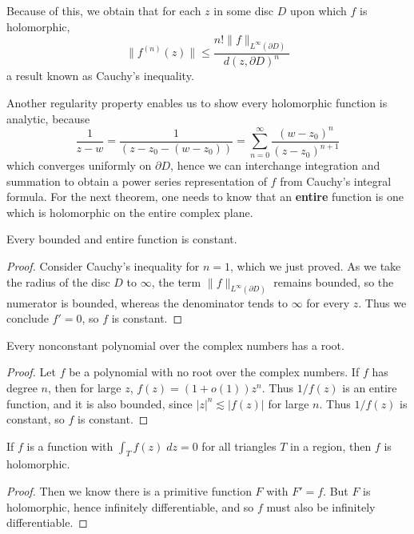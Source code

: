 \begin{remark}
    Because of this, we obtain that for each $z$ in some disc $D$ upon which $f$ is holomorphic,
    \[ \| f^{(n)}(z) \| \leq \frac{n! \| f \|_{L^\infty(\partial D)}}{d(z,\partial D)^n} \]
    a result known as Cauchy's inequality. 
\end{remark}

Another regularity property enables us to show every holomorphic function is analytic, because
%
\[ \frac{1}{z - w} = \frac{1}{(z - z_0 - (w - z_0))} = \sum_{n = 0}^\infty \frac{(w - z_0)^n}{(z - z_0)^{n+1}} \]
%
which converges uniformly on $\partial D$, hence we can interchange integration and summation to obtain a power series representation of $f$ from Cauchy's integral formula. For the next theorem, one needs to know that an {\bf entire} function is one which is holomorphic on the entire complex plane.

\begin{theorem}[Louville]
    Every bounded and entire function is constant.
\end{theorem}
\begin{proof}
    Consider Cauchy's inequality for $n = 1$, which we just proved. As we take the radius of the disc $D$ to $\infty$, the term $\| f \|_{L^\infty(\partial D)}$ remains bounded, so the numerator is bounded, whereas the denominator tends to $\infty$ for every $z$. Thus we conclude $f' = 0$, so $f$ is constant.
\end{proof}

\begin{theorem}
    Every nonconstant polynomial over the complex numbers has a root.
\end{theorem}
\begin{proof}
    Let $f$ be a polynomial with no root over the complex numbers. If $f$ has degree $n$, then for large $z$, $f(z) = (1 + o(1))z^n$. Thus $1/f(z)$ is an entire function, and it is also bounded, since $|z|^n \lesssim |f(z)|$ for large $n$. Thus $1/f(z)$ is constant, so $f$ is constant.
\end{proof}

\begin{theorem}[Morera]
    If $f$ is a function with $\int_T f(z)\; dz = 0$ for all triangles $T$ in a region, then $f$ is holomorphic.
\end{theorem}
\begin{proof}
    Then we know there is a primitive function $F$ with $F' = f$. But $F$ is holomorphic, hence infinitely differentiable, and so $f$ must also be infinitely differentiable.
\end{proof}

